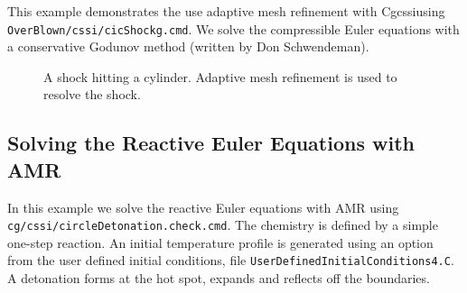 \documentclass{article}
\newcommand{\Solver}{Cgcssi}
\begin{document}
This example demonstrates the use adaptive mesh refinement with \Solver using {\tt OverBlown/cssi/cicShockg.cmd}.
We solve the compressible Euler equations with a conservative Godunov method (written by Don Schwendeman).


{
\newcommand{\figWidth}{7.27cm}
\newcommand{\trimfig}[2]{\trimPlot{#1}{#2}{.0}{.0}{.0}{.0}}
\newcommand{\figWidtha}{8cm}
\newcommand{\trimfiga}[2]{\trimPlot{#1}{#2}{.0}{.0}{.1}{.0}}
\begin{figure}[hbt]
\begin{center}
\end{center}
 \caption{A shock hitting a cylinder. Adaptive mesh refinement is used to resolve the shock.}
\end{figure}
}



\clearpage
\subsection{Solving the Reactive Euler Equations with AMR}

In this example we solve the reactive Euler equations with AMR using
{\tt cg/cssi/circleDetonation.check.cmd}. The chemistry is defined by a simple one-step
reaction. An initial temperature profile
is generated using an option from the user defined initial conditions, file {\tt UserDefinedInitialConditions4.C}.
A detonation forms at the hot spot, expands and reflects off the boundaries.
\end{document}
